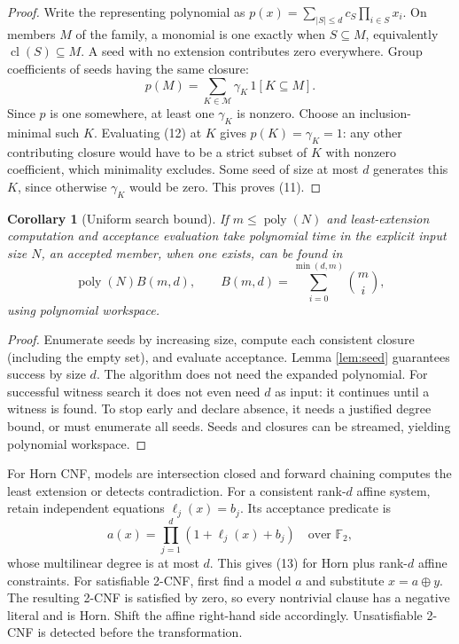 \documentclass[11pt]{article}
\newtheorem{corollary}{Corollary}
\newcommand{\poly}{\operatorname{poly}}
\newcommand{\cl}{\operatorname{cl}}
\newcommand{\F}{\mathbb F_2}
\begin{document}
\begin{proof}
Write the representing polynomial as
$p(x)=\sum_{|S|\le d}c_S\prod_{i\in S}x_i$.
On members $M$ of the family, a monomial is one exactly when
$S\subseteq M$, equivalently $\cl(S)\subseteq M$.
A seed with no extension contributes zero everywhere.
Group coefficients of seeds having the same closure:
\[
 p(M)=\sum_{K\in\mathcal M}\gamma_K\,1[K\subseteq M].
 \tag{12}
\]
Since $p$ is one somewhere, at least one $\gamma_K$ is nonzero.
Choose an inclusion-minimal such $K$. Evaluating (12) at $K$ gives
$p(K)=\gamma_K=1$: any other contributing closure would have to be a
strict subset of $K$ with nonzero coefficient, which minimality excludes.
Some seed of size at most $d$ generates this $K$, since otherwise
$\gamma_K$ would be zero. This proves (11).
\end{proof}

\begin{corollary}[Uniform search bound]\label{cor:seedsearch}
If $m\le\poly(N)$ and least-extension computation and acceptance evaluation
take polynomial time in the explicit input size $N$, an accepted member, when one exists,
can be found in
\[
 \poly(N) B(m,d),\qquad
 B(m,d)=\sum_{i=0}^{\min(d,m)}\binom mi,
 \tag{13}
\]
using polynomial workspace.
\end{corollary}

\begin{proof}
Enumerate seeds by increasing size, compute each consistent closure
(including the empty set), and evaluate acceptance.
Lemma \ref{lem:seed} guarantees success by size $d$.
The algorithm does not need the expanded polynomial. For successful
witness search it does not even need $d$ as input: it continues until a
witness is found. To stop early and declare absence, it needs a justified
degree bound, or must enumerate all seeds. Seeds and closures can be
streamed, yielding polynomial workspace.
\end{proof}

For Horn CNF, models are intersection closed and forward chaining computes
the least extension or detects contradiction.
For a consistent rank-$d$ affine system, retain independent equations
$\ell_j(x)=b_j$. Its acceptance predicate is
\[
 a(x)=\prod_{j=1}^d(1+\ell_j(x)+b_j)
 \quad\text{over }\F,
 \tag{14}
\]
whose multilinear degree is at most $d$.
This gives (13) for Horn plus rank-$d$ affine constraints.
For satisfiable 2-CNF, first find a model $a$ and substitute $x=a\oplus y$.
The resulting 2-CNF is satisfied by zero, so every nontrivial clause
has a negative literal and is Horn. Shift the affine right-hand side
accordingly. Unsatisfiable 2-CNF is detected before the transformation.
\end{document}
